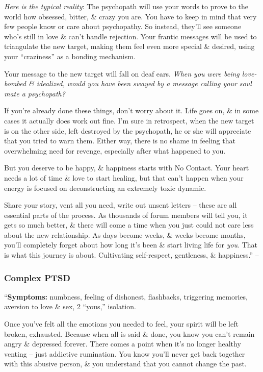 \documentclass{article}
\numberwithin{equation}{section}
\begin{document}
\textit{Here is the typical reality}: The psychopath will use your words to prove to the world how obsessed, bitter, \& crazy you are. You have to keep in mind that very few people know or care about psychopathy. So instead, they'll see someone who's still in love \& can't handle rejection. Your frantic messages will be used to triangulate the new target, making them feel even more special \& desired, using your ``craziness'' as a bonding mechanism.

Your message to the new target will fall on deaf ears. \textit{When you were being love-bombed \& idealized, would you have been swayed by a message calling your soul mate a psychopath?}

If you're already done these things, don't worry about it. Life goes on, \& in some cases it actually does work out fine. I'm sure in retrospect, when the new target is on the other side, left destroyed by the psychopath, he or she will appreciate that you tried to warn them. Either way, there is no shame in feeling that overwhelming need for revenge, especially after what happened to you.

But you deserve to be happy, \& happiness starts with No Contact. Your heart needs a lot of time \& love to start healing, but that can't happen when your energy is focused on deconstructing an extremely toxic dynamic.

Share your story, vent all you need, write out unsent letters -- these are all essential parts of the process. As thousands of forum members will tell you, it gets so much better, \& there will come a time when you just could not care less about the new relationship. As days become weeks, \& weeks become months, you'll completely forget about how long it's been \& start living life for \textit{you}. That is what this journey is about. Cultivating self-respect, gentleness, \& happiness.'' -- \cite[pp. 126--127]{MacKenzie2015}

\subsubsection{Complex PTSD}
``\textbf{Symptoms:} numbness, feeling of dishonest, flashbacks, triggering memories, aversion to love \& sex, 2 ``yous,'' isolation.

Once you've felt all the emotions you needed to feel, your spirit will be left broken, exhausted. Because when all is said \& done, you know you can't remain angry \& depressed forever. There comes a point when it's no longer healthy venting -- just addictive rumination. You know you'll never get back together with this abusive person, \& you understand that you cannot change the past.
\end{document}
